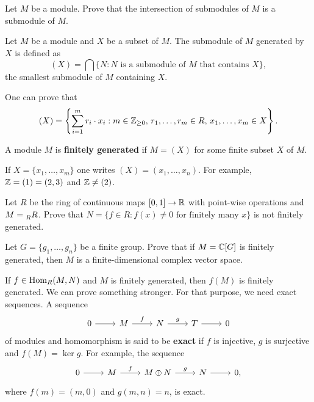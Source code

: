 \chapter{}


\begin{exercise}
\label{xca:modules_intersection}
    Let $M$ be a module. 
    Prove that the intersection of submodules of $M$ 
    is a submodule of $M$. 
\end{exercise}

\begin{definition}
Let $M$ be a module and $X$ be a subset of $M$. The submodule
of $M$ generated by $X$ is defined as
\[
(X)=\bigcap\{N:N\text{ is a submodule of $M$ that contains $X$}\},
\]
the smallest submodule of $M$ containing $X$. 
\end{definition}

One can prove that  
\[
(X)=\left\{\sum_{i=1}^mr_i\cdot x_i:m\in\mathbb{Z}_{\geq0},\,r_1,\dots,r_m\in R,\,x_1,\dots,x_m\in X\right\}.
\]

\begin{definition}
    A module $M$ is \textbf{finitely generated} if $M=(X)$ for some finite subset $X$ of $M$.
\end{definition}

If $X=\{x_1,\dots,x_m\}$ one writes $(X)=(x_1,\dots,x_n)$.
For example, $\mathbb{Z}=(1)=(2,3)$ and $\mathbb{Z}\ne (2)$.

\begin{exercise}
    Let $R$ be the ring of continuous maps $[0,1]\to\mathbb{R}$ with point-wise operations and 
    $M=\prescript{}{R}{R}$. Prove that
    $N=\{f\in R:f(x)\ne0\text{ for finitely many $x$}\}$ is not finitely generated. 
\end{exercise}

\begin{exercise}
    Let $G=\{g_1,\dots,g_n\}$ be a finite group. Prove that if $M=\mathbb{C}[G]$ is finitely generated, then
    $M$ is a finite-dimensional complex vector space. 
\end{exercise}

If $f\in\operatorname{Hom}_R(M,N)$ and $M$ is finitely generated, then 
$f(M)$ is finitely generated. We can prove something stronger. For that purpose,
we need exact sequences. 
A sequence 
	\begin{equation}
	\label{eq:exacta1}	
    \begin{tikzcd}
	0 & M & N & T & 0
	\arrow[from=1-1, to=1-2]
	\arrow["f", from=1-2, to=1-3]
	\arrow["g", from=1-3, to=1-4]
	\arrow[from=1-4, to=1-5]
    \end{tikzcd}
  	\end{equation}
of modules and homomorphism is said to be \textbf{exact} 
if $f$ is injective, $g$ is surjective and $f(M)=\ker g$. For example,
the sequence
\[
\begin{tikzcd}
	0 & M & M\oplus N & N & 0,
	\arrow[from=1-1, to=1-2]
	\arrow["f", from=1-2, to=1-3]
	\arrow["g", from=1-3, to=1-4]
	\arrow[from=1-4, to=1-5]
\end{tikzcd}
\]
where $f(m)=(m,0)$ and $g(m,n)=n$, is exact.

